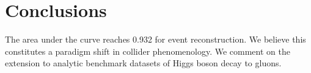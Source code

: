 \section{Conclusions}\label{sec:conclusions}

The area under the curve reaches 0.932 for event reconstruction. We
believe this constitutes a paradigm shift in collider phenomenology. We
comment on the extension to analytic benchmark datasets of Higgs boson
decay to gluons.


